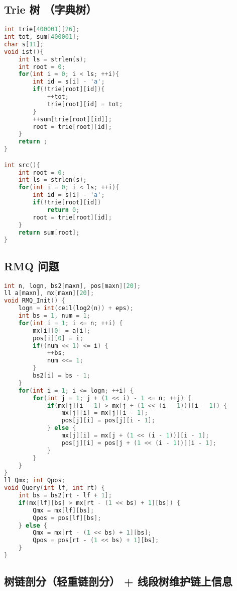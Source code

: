 \subsection{Trie 树 （字典树）}

\begin{lstlisting}[language=C++]
int trie[400001][26];
int tot, sum[400001];
char s[11];
void ist(){
    int ls = strlen(s);
    int root = 0;
    for(int i = 0; i < ls; ++i){
        int id = s[i] - 'a';
        if(!trie[root][id]){
            ++tot;
            trie[root][id] = tot;
        }
        ++sum[trie[root][id]];
        root = trie[root][id];
    }
    return ;
}

int src(){
    int root = 0;
    int ls = strlen(s);
    for(int i = 0; i < ls; ++i){
        int id = s[i] - 'a';
        if(!trie[root][id])
            return 0;
        root = trie[root][id];
    }
    return sum[root];
}
\end{lstlisting}

\subsection{RMQ 问题}

\begin{lstlisting}[language=C++]
int n, logn, bs2[maxn], pos[maxn][20];
ll a[maxn], mx[maxn][20];
void RMQ_Init() {
    logn = int(ceil(log2(n)) + eps);
    int bs = 1, num = 1;
    for(int i = 1; i <= n; ++i) {
        mx[i][0] = a[i];
        pos[i][0] = i;
        if((num << 1) <= i) {
            ++bs;
            num <<= 1;
        }
        bs2[i] = bs - 1;
    }
    for(int i = 1; i <= logn; ++i) {
        for(int j = 1; j + (1 << i) - 1 <= n; ++j) {
            if(mx[j][i - 1] > mx[j + (1 << (i - 1))][i - 1]) {
                mx[j][i] = mx[j][i - 1];
                pos[j][i] = pos[j][i - 1];
            } else {
                mx[j][i] = mx[j + (1 << (i - 1))][i - 1];
                pos[j][i] = pos[j + (1 << (i - 1))][i - 1];
            }
        }
    }
}
ll Qmx; int Qpos;
void Query(int lf, int rt) {
    int bs = bs2[rt - lf + 1];
    if(mx[lf][bs] > mx[rt - (1 << bs) + 1][bs]) {
        Qmx = mx[lf][bs];
        Qpos = pos[lf][bs];
    } else {
        Qmx = mx[rt - (1 << bs) + 1][bs];
        Qpos = pos[rt - (1 << bs) + 1][bs];
    }
}
\end{lstlisting}

\subsection{树链剖分（轻重链剖分） + 线段树维护链上信息}

